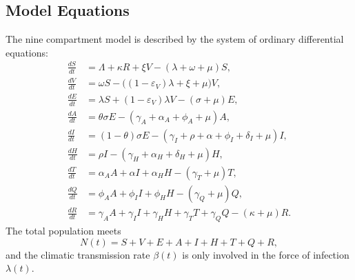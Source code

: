 \documentclass[12pt,a4paper]{article}
\theoremstyle{definition}
\theoremstyle{remark}
\begin{document}
\subsection{Model Equations}
The nine compartment model is described by the system of ordinary differential equations:
\begin{equation}
\begin{aligned}
\frac{dS}{dt}&=\Lambda+\kappa R+\xi V-(\lambda+\omega+\mu)S,\\[1mm]
\frac{dV}{dt}&=\omega S-\bigl((1-\varepsilon_V)\lambda+\xi+\mu\bigr)V,\\[1mm]
\frac{dE}{dt}&=\lambda S+(1-\varepsilon_V)\lambda V-(\sigma+\mu)E,\\[1mm]
\frac{dA}{dt}&=\theta\sigma E-(\gamma_A+\alpha_A+\phi_A+\mu)A,\\[1mm]
\frac{dI}{dt}&=(1-\theta)\sigma E-(\gamma_I+\rho+\alpha+\phi_I+\delta_I+\mu)I,\\[1mm]
\frac{dH}{dt}&=\rho I-(\gamma_H+\alpha_H+\delta_H+\mu)H,\\[1mm]
\frac{dT}{dt}&=\alpha_A A+\alpha I+\alpha_H H-(\gamma_T+\mu)T,\\[1mm]
\frac{dQ}{dt}&=\phi_A A+\phi_I I+\phi_H H-(\gamma_Q+\mu)Q,\\[1mm]
\frac{dR}{dt}&= \gamma_A A + \gamma_I I + \gamma_H H + \gamma_T T + \gamma_Q Q - (\kappa + \mu)R.
\end{aligned}
\label{eq:flu_model}
\end{equation}
The total population meets
\[
N(t)=S+V+E+A+I+H+T+Q+R,
\]
and the climatic transmission rate $\beta(t)$ is only involved in the force of infection $\lambda(t)$.
\end{document}
